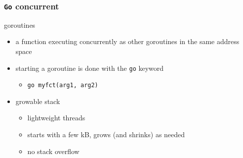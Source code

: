 \documentclass[9pt]{beamer}
\newcommand{\mypurple}[1]{{\color[rgb]{0.7,0,0.8}#1}}
\begin{document}
\begin{frame}
\frametitle{\verb~Go~ concurrent}
\begin{block}{goroutines}


\begin{itemize}
\item a function executing concurrently as other goroutines \alert{in the same address space}
\item starting a goroutine is done with the \verb~go~ keyword
\begin{itemize}
\item \verb~go myfct(arg1, arg2)~
\end{itemize}
\item growable stack
\begin{itemize}
\item \alert{lightweight threads}
\item starts with a few kB, grows (and shrinks) as needed
\item \mypurple{no stack overflow}
\end{itemize}
\end{itemize}
\end{block}
\end{frame}
\end{document}
